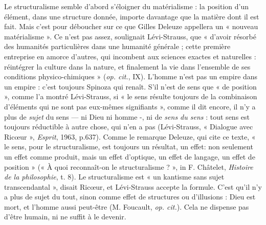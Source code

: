 Le structuralisme semble d’abord s'éloigner du matérialisme : la position
d’un élément, dans une structure donnée, importe davantage que la matière
dont il est fait. Mais c’est pour déboucher sur ce que Gilles Deleuze appellera
un « nouveau matérialisme ». Ce n’est pas assez, soulignait Lévi-Strauss, que
« d’avoir résorbé des humanités particulières dans une humanité générale ; cette
première entreprise en amorce d’autres, qui incombent aux sciences exactes et
naturelles : réintégrer la culture dans la nature, et finalement la vie dans
l’ensemble de ses conditions physico-chimiques » ({\it op. cit.}, IX). L'homme n’est
pas un empire dans un empire : c’est toujours Spinoza qui renaît. S’il n’est de
sens que « de position », comme l’a montré Lévi-Strauss, si « le sens résulte toujours
de la combinaison d’éléments qui ne sont pas eux-mêmes signifiants »,
comme il dit encore, il n’y a plus de {\it sujet} du sens — ni Dieu ni homme -, ni de
{\it sens du sens} : tout sens est toujours réductible à autre chose, qui n’en a pas
(Lévi-Strauss, « Dialogue avec Ricœur », {\it Esprit}, 1963, p.637). Comme le
remarque Deleuze, qui cite ce texte, « le sens, pour le structuralisme, est toujours
un résultat, un effet: non seulement un effet comme produit, mais un effet
d'optique, un effet de langage, un effet de position » (« À quoi reconnaît-on le
structuralisme ? », in F. Châtelet, {\it Histoire de la philosophie}, t. 8). Le structuralisme
est « un kantisme sans sujet transcendantal », disait Ricœur, et Lévi-Strauss
accepte la formule. C’est qu’il n’y a plus de sujet du tout, sinon comme effet de
structures ou d'illusions : Dieu est mort, et l’homme aussi peut-être (M. Foucault,
{\it op. cit.}). Cela ne dispense pas d’être humain, ni ne suffit à le devenir.

